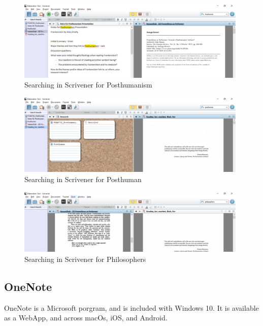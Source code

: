 \documentclass{article}
\begin{document}
\begin{figure}[htbp]
    \centering
    \includegraphics[width=11cm]{Images/ScrivenerTest004.PNG}
    \caption{Searching in Scrivener for Posthumanism}
    \label{fig:Scrivener Search Posthumanism}
\end{figure}

\begin{figure}[htbp]
    \centering
    \includegraphics[width=11cm]{Images/ScrivenerTest005.PNG}
    \caption{Searching in Scrivener for Posthuman}
    \label{fig:Scrivener Search Posthuman}
\end{figure}

\begin{figure}[htbp]
    \centering
    \includegraphics[width=11cm]{Images/ScrivenerTest006.PNG}
    \caption{Searching in Scrivener for Philosophers}
    \label{fig:Scrivener Search Philosophers}
\end{figure}

\pagebreak

\subsection{OneNote}

OneNote is a Microsoft porgram, and is included with Windows 10. It is available as a WebApp, and across macOs, iOS, and Android. 
\end{document}
